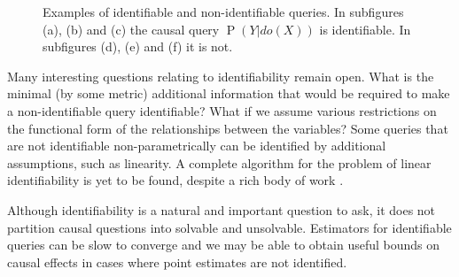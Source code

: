 \documentclass[11pt,a4paper,twoside]{report}
\renewcommand{\P}[1]{\operatorname{P}\left(#1\right)}
\theoremstyle{plain}
\theoremstyle{definition}
\begin{document}
\begin{figure}[ht]
\begin{subfigure}[t]{0.29\textwidth}
\centering
\vspace*{.5cm}
\caption{}
\label{fig:nid2_instrumental_variable}
\end{subfigure}
\begin{subfigure}[t]{0.29\textwidth}
\centering
\vspace*{.5cm}
\caption{}
\label{fig:nid3}
\end{subfigure}
\caption{Examples of identifiable and non-identifiable queries. In subfigures (a), (b) and (c) the causal query $\P{Y|do(X)}$ is identifiable. In subfigures (d), (e) and (f) it is not.}
\label{fig:identify}
\end{figure}


Many interesting questions relating to identifiability remain open. What is the minimal (by some metric) additional information that would be required to make a non-identifiable query identifiable? What if we assume various restrictions on the functional form of the relationships between the variables? Some queries that are not identifiable non-parametrically can be identified by additional assumptions, such as linearity. A complete algorithm for the problem of linear identifiability is yet to be found, despite a rich body of work \citep{Chen2016,tian2009parameter,drton2011global}.

Although identifiability is a natural and important question to ask, it does not partition causal questions into solvable and unsolvable. Estimators for identifiable queries can be slow to converge and we may be able to obtain useful bounds on causal effects in cases where point estimates are not identified.
\end{document}
